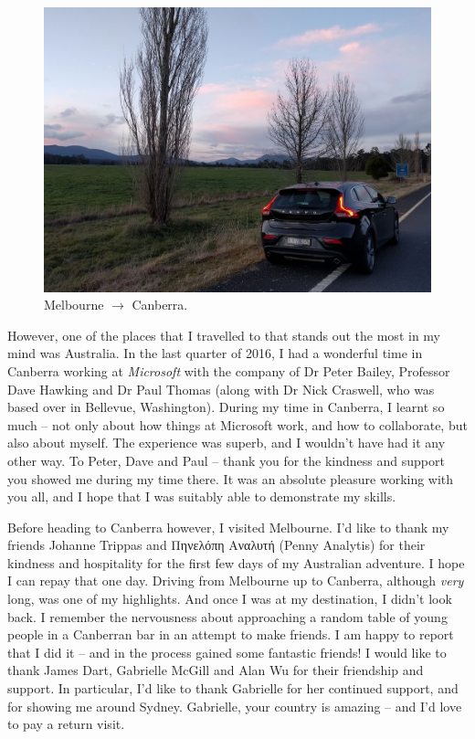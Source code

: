 \begin{preamble}
\renewcommand{\figurename}{Picture}
\begin{figure}
    \begin{center}
    \vspace*{-9mm}
    \includegraphics[width=1\textwidth]{figures/ch0-aus.jpg}
    \end{center}
    \vspace*{-6mm}
    \caption[]{Melbourne $\rightarrow$ Canberra.}
    \label{fig:acks_australia}
\end{figure}
\renewcommand{\figurename}{Figure}

However, one of the places that I travelled to that stands out the most in my mind was Australia. In the last quarter of 2016, I had a wonderful time in Canberra working at \emph{Microsoft} with the company of Dr Peter Bailey, Professor Dave Hawking and Dr Paul Thomas (along with Dr Nick Craswell, who was based over in Bellevue, Washington). During my time in Canberra, I learnt so much -- not only about how things at Microsoft work, and how to collaborate, but also about myself. The experience was superb, and I wouldn't have had it any other way. To Peter, Dave and Paul -- thank you for the kindness and support you showed me during my time there. It was an absolute pleasure working with you all, and I hope that I was suitably able to demonstrate my skills.

Before heading to Canberra however, I visited Melbourne. I'd like to thank my friends Johanne Trippas and Πηνελόπη Αναλυτή (Penny Analytis) for their kindness and hospitality for the first few days of my Australian adventure. I hope I can repay that one day. Driving from Melbourne up to Canberra, although \emph{very} long, was one of my highlights. And once I was at my destination, I didn't look back. I remember the nervousness about approaching a random table of young people in a Canberran bar in an attempt to make friends. I am happy to report that I did it -- and in the process gained some fantastic friends! I would like to thank James Dart, Gabrielle McGill and Alan Wu for their friendship and support. In particular, I'd like to thank Gabrielle for her continued support, and for showing me around Sydney. Gabrielle, your country is amazing -- and I'd love to pay a return visit.


\end{preamble}
